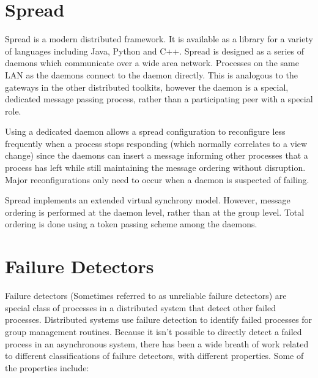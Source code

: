 \section{Spread}

Spread\cite{SPREADTOOLKIT} is a modern distributed framework. It is available as a library for a variety of languages including Java, Python and C++. Spread is designed as a series of daemons which communicate over a wide area network. Processes on the same LAN as the daemons connect to the daemon directly. This is analogous to the gateways in the other distributed toolkits, however the daemon is a special, dedicated message passing process, rather than a participating peer with a special role.

Using a dedicated daemon allows a spread configuration to reconfigure less frequently when a process stops responding (which normally correlates to a view change) since the daemons can insert a message informing other processes that a process has left while still maintaining the message ordering without disruption. Major reconfigurations only need to occur when a daemon is suspected of failing.

Spread implements an extended virtual synchrony model. However, message ordering is performed at the daemon level, rather than at the group level. Total ordering is done using a token passing scheme among the daemons.

\section{Failure Detectors}

Failure detectors \cite{FAILUREDETECTORS} (Sometimes referred to as unreliable failure detectors) are special class of processes in a distributed system that detect other failed processes. Distributed systems use failure detection to identify failed processes for group management routines. Because it isn't possible to directly detect a failed process in an asynchronous system, there has been a wide breath of work related to different classifications of failure detectors, with different properties. Some of the properties include\cite{FAILUREDETECTORS}:

